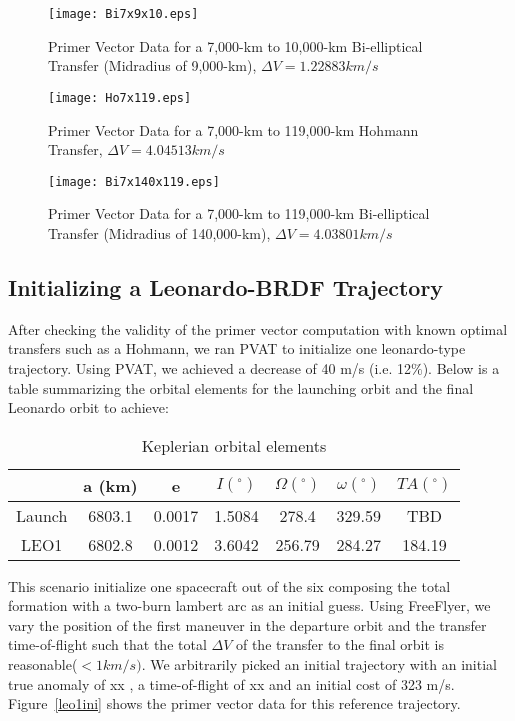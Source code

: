 \documentclass[12pt]{report}
\begin{document}
\begin{figure}[ht]
\centerline{\texttt{[image: Bi7x9x10.eps]}}
\caption{Primer Vector Data for a 7,000-km to 10,000-km
Bi-elliptical Transfer (Midradius of 9,000-km), $\Delta V =
1.22883 km/s$ } \label{Bi7x9x10}
\end{figure}

\begin{figure}[ht]
\centerline{\texttt{[image: Ho7x119.eps]}}
\caption{Primer Vector Data for a 7,000-km to 119,000-km Hohmann
Transfer, $\Delta V = 4.04513 km/s$ } \label{Ho7x119}
\end{figure}

\begin{figure}[ht]
\centerline{\texttt{[image: Bi7x140x119.eps]}}
\caption{Primer Vector Data for a 7,000-km to 119,000-km
Bi-elliptical Transfer (Midradius of 140,000-km), $\Delta V =
4.03801 km/s$} \label{Bi7x140x119}
\end{figure}



\subsection{Initializing a Leonardo-BRDF Trajectory}
\noindent After checking the validity of the primer vector
computation with known optimal transfers such as a Hohmann, we ran
PVAT to initialize one leonardo-type trajectory. Using PVAT, we
achieved a decrease of 40 m/s (i.e. 12$\%$). Below is a table
summarizing the orbital elements for the launching orbit and the
final Leonardo orbit to achieve:

\begin{table}[htb]
\centering \caption{Keplerian orbital elements} \vspace{0 pt}
\begin{tabular}{ccccccc} \hline \hline
& a (km) & e & $I (^{\circ})$ & $\Omega (^{\circ})$ & $\omega
(^{\circ})$ & $TA (^{\circ})$ \\ \hline
 Launch & 6803.1 &  0.0017  & 1.5084 & 278.4  & 329.59 & TBD \\
 LEO1   & 6802.8 &  0.0012  & 3.6042 & 256.79 & 284.27 & 184.19\\
\hline \hline
\end{tabular}
\label{table:orbitelemt}
\end{table}

\noindent This scenario initialize one spacecraft out of the six
composing the total formation with a two-burn lambert arc as an
initial guess. Using FreeFlyer, we vary the position of the first
maneuver in the departure orbit and the transfer time-of-flight
such that the total $\Delta V$ of the transfer to the final orbit
is reasonable($< 1 km/s)$. We arbitrarily picked an initial
trajectory with an initial true anomaly of xx , a time-of-flight
of xx and an initial cost of 323 m/s. Figure~\ref{leo1ini} shows
the primer vector data for this reference trajectory.
\end{document}
